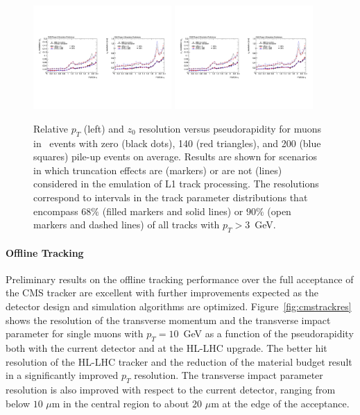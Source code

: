 \begin{figure}[h!tbp]
\begin{center}
  \includegraphics[width=0.47\textwidth]{figures/cmsupgrade/TDR-17-001_fig6_8_a.pdf} \hfill
  \includegraphics[width=0.47\textwidth]{figures/cmsupgrade/TDR-17-001_fig6_8_b.pdf}
  \caption{ Relative $p_T$ (left) and $z_0$ resolution versus pseudorapidity for muons in \ttbar~events with zero (black dots), 140 (red triangles), and 200 (blue squares) pile-up events on average. 
Results are shown for scenarios in which truncation effects are (markers) or are not (lines) considered in the emulation of L1 track processing. 
The resolutions correspond to intervals in the track parameter distributions that encompass $68\%$ (filled markers and solid lines) or $90\%$ (open markers and dashed lines) of all tracks with $p_T > 3$~GeV.  }
  \label{fig:cmsL1tracks}
\end{center}
\end{figure}

\paragraph{Offline Tracking}

Preliminary results on the offline tracking performance over the full acceptance of the CMS tracker are excellent with further improvements expected as the detector design and simulation algorithms are optimized.
Figure~\ref{fig:cmstrackres} shows the resolution of the transverse momentum and the transverse impact parameter
for single muons with $p_T = 10$~GeV as a function of the pseudorapidity both with the current
detector and at the HL-LHC upgrade. The better hit resolution of the HL-LHC tracker and the reduction of the material budget result in a significantly improved
$p_T$ resolution. The transverse impact parameter resolution is also improved with respect to the current detector, ranging from below $10\,\,\mu\mathrm{m}$ in the central region to about $20\,\,\mu\mathrm{m}$ at the edge of the acceptance.

